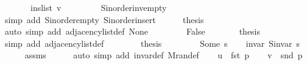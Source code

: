 \begin{isabellebody}
\ \ \ \ \ \ \ ins{\isacharunderscore}{\kern0pt}list\ {\isacharquery}{\kern0pt}v\ {\isacharbrackleft}{\kern0pt}{\isacharbrackright}{\kern0pt}{\isachardoublequoteclose}\isanewline
\ \ \ \ \ \ \isamarkupfalse%
\ S{\isachardot}{\kern0pt}inorder{\isacharunderscore}{\kern0pt}inv{\isacharunderscore}{\kern0pt}empty\isanewline
\ \ \ \ \ \ \isamarkupfalse%
\ {\isacharparenleft}{\kern0pt}simp\ add{\isacharcolon}{\kern0pt}\ S{\isachardot}{\kern0pt}inorder{\isacharunderscore}{\kern0pt}empty\ S{\isachardot}{\kern0pt}inorder{\isacharunderscore}{\kern0pt}insert{\isacharparenright}{\kern0pt}\isanewline
\ \ \ \ \isamarkupfalse%
\ {\isacharquery}{\kern0pt}thesis\isanewline
\ \ \ \ \ \ \isamarkupfalse%
\ {\isacharparenleft}{\kern0pt}auto\ simp\ add{\isacharcolon}{\kern0pt}\ adjacency{\isacharunderscore}{\kern0pt}list{\isacharunderscore}{\kern0pt}def\ None{\isacharparenright}{\kern0pt}\isanewline
\ \ \isamarkupfalse%
\isanewline
\ \ \ \ \isamarkupfalse%
\ False\isanewline
\ \ \ \ \isamarkupfalse%
\ \isamarkupfalse%
\ {\isacharquery}{\kern0pt}thesis\isanewline
\ \ \ \ \ \ \isamarkupfalse%
\ {\isacharparenleft}{\kern0pt}simp\ add{\isacharcolon}{\kern0pt}\ adjacency{\isacharunderscore}{\kern0pt}list{\isacharunderscore}{\kern0pt}def{\isacharparenright}{\kern0pt}\isanewline
\ \ \isamarkupfalse%
\isanewline
\ \ \isamarkupfalse%
\ \isamarkupfalse%
\ {\isacharquery}{\kern0pt}thesis\isanewline
\ \ \ \ \isacommand{{\isachardot}{\kern0pt}}\isamarkupfalse%
\isanewline
{}\isamarkupfalse%
\isanewline
\ \ \isamarkupfalse%
\ {\isacharparenleft}{\kern0pt}Some\ s{\isacharparenright}{\kern0pt}\isanewline
\ \ \isamarkupfalse%
\ invar{\isacharcolon}{\kern0pt}\ {\isachardoublequoteopen}S{\isachardot}{\kern0pt}invar\ s{\isachardoublequoteclose}\isanewline
\ \ \ \ \isamarkupfalse%
\ assms\isanewline
\ \ \ \ \isamarkupfalse%
\ {\isacharparenleft}{\kern0pt}auto\ simp\ add{\isacharcolon}{\kern0pt}\ invar{\isacharunderscore}{\kern0pt}def\ M{\isachardot}{\kern0pt}ran{\isacharunderscore}{\kern0pt}def{\isacharparenright}{\kern0pt}\isanewline
\ \ \isamarkupfalse%
\ {\isacharquery}{\kern0pt}u\ {\isacharequal}{\kern0pt}\ {\isachardoublequoteopen}fst\ p{\isachardoublequoteclose}\isanewline
\ \ \isamarkupfalse%
\ {\isacharquery}{\kern0pt}v\ {\isacharequal}{\kern0pt}\ {\isachardoublequoteopen}snd\ p{\isachardoublequoteclose}\isanewline

\end{isabellebody}
